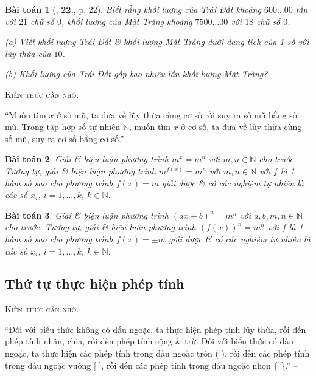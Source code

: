 \documentclass{article}
\numberwithin{equation}{section}
\newtheorem{baitoan}{Bài toán}[section]
\begin{document}
\begin{baitoan}[\cite{Trong_Toan_6_2021}, \textbf{22.}, p. 22]
	Biết rằng khối lượng của Trái Đất khoảng $600\ldots 00$ tấn với $21$ chữ số $0$, khối lượng của Mặt Trăng khoảng $7500\ldots 00$ với $18$ chữ số $0$.
	\begin{enumerate*}
		\item[(a)] Viết khối lượng Trái Đất \& khối lượng Mặt Trăng dưới dạng tích của 1 số với lũy thừa của $10$.
		\item[(b)] Khối lượng của Trái Đất gấp bao nhiêu lần khối lượng Mặt Trăng?
	\end{enumerate*}
\end{baitoan}
\noindent\textsc{Kiến thức cần nhớ.}
\begin{tcolorbox}
	``Muốn tìm $x$ ở số mũ, ta đưa về lũy thừa cùng cơ số rồi suy ra số mũ bằng số mũ. Trong tập hợp số tự nhiên $\mathbb{N}$, muốn tìm $x$ ở cơ số, ta đưa về lũy thừa cùng số mũ, suy ra cơ số bằng cơ số.'' -- \cite[p. 22]{Trong_Toan_6_2021}
\end{tcolorbox}

\begin{baitoan}
	Giải \& biện luận phương trình $m^x = m^n$ với $m,n\in\mathbb{N}$ cho trước. Tương tự, giải \& biện luận phương trình $m^{f(x)} = m^n$ với $m,n\in\mathbb{N}$ với $f$ là 1 hàm số sao cho phương trình $f(x) = m$ giải được \& có các nghiệm tự nhiên là các số $x_i$, $i = 1,\ldots,k$, $k\in\mathbb{N}$.
\end{baitoan}

\begin{baitoan}
	Giải \& biện luận phương trình $(ax + b)^n = m^n$ với $a,b,m,n\in\mathbb{N}$ cho trước. Tương tự, giải \& biện luận phương trình $(f(x))^n = m^n$ với $f$ là 1 hàm số sao cho phương trình $f(x) = \pm m$ giải được \& có các nghiệm tự nhiên là các số $x_i$, $i = 1,\ldots,k$, $k\in\mathbb{N}$.
\end{baitoan}

\subsection{Thứ tự thực hiện phép tính}
\textsc{Kiến thức cần nhớ.}
\begin{tcolorbox}
	``Đối với biểu thức không có dấu ngoặc, ta thực hiện phép tính lũy thừa, rồi đến phép tính nhân, chia, rồi đến phép tính cộng \& trừ. Đối với biểu thức có dấu ngoặc, ta thực hiện các phép tính trong dấu ngoặc tròn ( ), rồi đến các phép tính trong dấu ngoặc vuông [ ], rồi đến các phép tính trong dấu ngoặc nhọn \{ \}.'' -- \cite[p. 24]{Trong_Toan_6_2021}
\end{tcolorbox}
\end{document}
